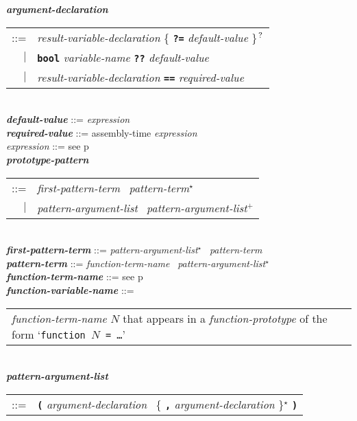 \documentclass[12pt]{article}
\newcommand{\TT}[1]{{\tt \bfseries #1}}
\newcommand{\STAR}{{\Large $^\star$}}
\newcommand{\PLUS}[1][]{{$^{+#1}$}}
\newcommand{\QMARK}{{$^{\,\mbox{\footnotesize ?}}$}}
\newcommand{\emkey}[1]{{\em \bfseries #1}}
\newcommand{\pagref}[1]{p\pageref{#1}}
\newenvironment{indpar}[1][0.3in]%
	{\begin{list}{}%
		     {\setlength{\itemsep}{0in}%
		      \setlength{\topsep}{0in}%
		      \setlength{\parsep}{1ex}%
		      \setlength{\labelwidth}{#1}%
		      \setlength{\leftmargin}{#1}%
		      \addtolength{\leftmargin}{\labelsep}}%
	 \item}%
	{\end{list}}
\begin{document}
\begin{indpar}
\emkey{argument-declaration}\label{ARGUMENT-DECLARATION} \\
\hspace*{1in}\begin{tabular}[t]{@{}rl@{}}
    ::= & {\em result-variable-declaration}
          \{ \TT{?=} {\em default-value} \}\QMARK{} \\
    $|$ & \TT{bool} {\em variable-name}
          \TT{??} {\em default-value} \\
    $|$ & {\em result-variable-declaration}
          \TT{==} {\em required-value} \\
    \end{tabular}
\\[0.5ex]
\emkey{default-value} ::= {\em expression}
\\[0.5ex]
\emkey{required-value} ::= assembly-time {\em expression}
\\[0.5ex]
{\em expression} ::= see \pagref{EXPRESSION}
\\[0.5ex]
\emkey{prototype-pattern}\label{FUNCTION-PATTERN}
    \begin{tabular}[t]{rl}
    ::= & {\em first-pattern-term}~ {\em pattern-term}\STAR{} \\
    $|$ & {\em pattern-argument-list}~ {\em pattern-argument-list}\PLUS{}
    \end{tabular}
\\[0.5ex]
\emkey{first-pattern-term} ::= {\em pattern-argument-list}\STAR{}~
				{\em pattern-term}
\\[0.5ex]
\emkey{pattern-term}
    ::= {\em function-term-name}~ {\em pattern-argument-list}\STAR{}
\\[0.5ex]
\emkey{function-term-name} ::= see \pagref{FUNCTION-TERM-NAME}
\\[0.5ex]
\emkey{function-variable-name}\label{FUNCTION-VARIABLE-NAME} ::= \\
\hspace*{1in}
    \begin{tabular}[t]{@{}p{5in}@{}}
    {\em function-term-name} $N$ that appears in a {\em function-prototype}
    of the form `{\tt function $N$ = \ldots}'
    \end{tabular}
\\[0.5ex]
\emkey{pattern-argument-list} \\
\hspace*{1in}
    \begin{tabular}[t]{@{}rl}
    ::= & \TT{(} {\em argument-declaration}~
                 \{ \TT{,} {\em argument-declaration} \}\STAR{} \TT{)} \\

\end{tabular}
\end{indpar}
\end{document}
